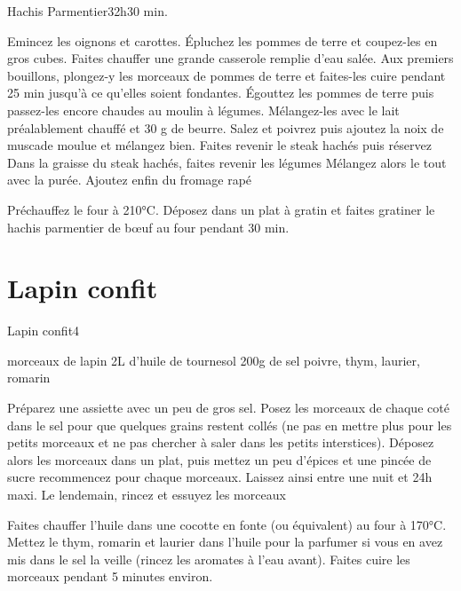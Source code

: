 {\begin{recette}{Hachis Parmentier}{3}{2h}{30 min.}
\begin{preparation}
\etape Emincez les oignons et carottes.
\etape Épluchez les pommes de terre et coupez-les en gros cubes. 
\etape Faites chauffer une grande casserole remplie d’eau salée. Aux premiers bouillons, plongez-y les morceaux de pommes de terre et faites-les cuire pendant 25 min jusqu’à ce qu’elles soient fondantes.
\etape Égouttez les pommes de terre puis passez-les encore chaudes au moulin à légumes. 
\etape Mélangez-les avec le lait préalablement chauffé et 30 g de beurre. Salez et poivrez puis ajoutez la noix de muscade moulue et mélangez bien.
\etape Faites revenir le steak hachés puis réservez
\etape Dans la graisse du steak hachés, faites revenir les légumes
\etape Mélangez alors le tout avec la purée. Ajoutez enfin du fromage rapé
\end{preparation}

\begin{cuisson}
Préchauffez le four à 210°C. Déposez dans un plat à gratin et faites gratiner le hachis parmentier de bœuf au four pendant 30 min.
\end{cuisson}
\end{recette}

\section{Lapin confit}
\begin{recette}{Lapin confit}{4}{}{}
\begin{ingredients}
\ingredient morceaux de lapin
\ingredient 2L d'huile de tournesol
\ingredient 200g de sel
\ingredient poivre, thym, laurier, romarin
\end{ingredients}

\begin{preparation}
\etape Préparez une assiette avec un peu de gros sel. Posez les morceaux de chaque coté dans le sel pour que quelques grains restent collés (ne pas en mettre plus pour les petits morceaux et ne pas chercher à saler dans les petits interstices). Déposez alors les morceaux dans un plat, puis mettez un peu d'épices et une pincée de sucre
\etape recommencez pour chaque morceaux. Laissez ainsi entre une nuit et 24h maxi. 
\etape Le lendemain, rincez et essuyez les morceaux
\end{preparation}

\begin{cuisson}
Faites chauffer l'huile dans une cocotte en fonte (ou équivalent) au four à 170°C. Mettez le thym, romarin et laurier dans l'huile pour la parfumer si vous en avez mis dans le sel la veille (rincez les aromates à l'eau avant). Faites cuire les morceaux pendant 5 minutes environ. 


\end{cuisson}
\end{recette}}

